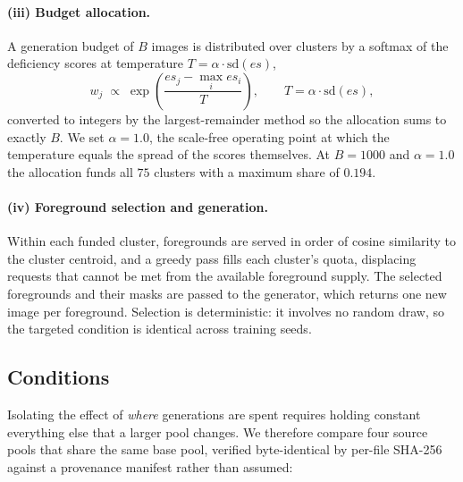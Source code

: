 \documentclass{article}
\begin{document}
\paragraph{(iii) Budget allocation.}
A generation budget of $B$ images is distributed over clusters by a softmax of
the deficiency scores at temperature $T = \alpha \cdot \mathrm{sd}(\mathit{es})$,
\begin{equation}
w_j \;\propto\; \exp\!\left(\frac{\mathit{es}_j - \max_i \mathit{es}_i}{T}\right),
\qquad
T = \alpha \cdot \mathrm{sd}(\mathit{es}),
\label{eq:alloc}
\end{equation}
converted to integers by the largest-remainder method so the allocation sums to
exactly $B$. We set $\alpha = 1.0$, the scale-free operating point at which the
temperature equals the spread of the scores themselves. At $B = 1000$ and
$\alpha = 1.0$ the allocation funds all $75$ clusters with a maximum share of
$0.194$.

\paragraph{(iv) Foreground selection and generation.}
Within each funded cluster, foregrounds are served in order of cosine similarity
to the cluster centroid, and a greedy pass fills each cluster's quota, displacing
requests that cannot be met from the available foreground supply. The selected
foregrounds and their masks are passed to the generator, which returns one new
image per foreground. Selection is deterministic: it involves no random draw, so
the targeted condition is identical across training seeds.

\subsection{Conditions}
\label{sec:conditions}

Isolating the effect of \emph{where} generations are spent requires holding
constant everything else that a larger pool changes. We therefore compare four
source pools that share the same base pool, verified byte-identical by per-file
SHA-256 against a provenance manifest rather than assumed:
\end{document}
